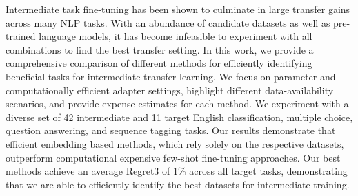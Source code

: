 Intermediate task fine-tuning has been shown to culminate in large transfer gains across many NLP tasks. With an abundance of candidate datasets as well as pre-trained language models, it has become infeasible to experiment with all combinations  to find the best transfer setting. In this work, we provide a comprehensive comparison of different methods for efficiently identifying beneficial tasks for intermediate transfer learning. We focus on parameter and computationally efficient adapter settings, highlight different data-availability scenarios, and provide expense estimates for each method. We experiment with a diverse set of 42 intermediate and 11 target English classification, multiple choice, question answering, and sequence tagging tasks. Our results demonstrate that efficient embedding based methods, which rely solely on the respective datasets, outperform computational expensive few-shot fine-tuning approaches. Our best methods achieve an average Regret\@3 of 1\%  across all target tasks, demonstrating that we are able to efficiently identify the best datasets for intermediate training.
